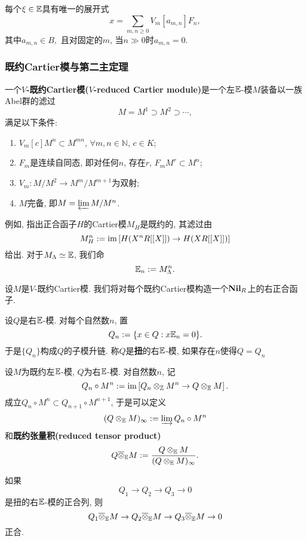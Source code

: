 \begin{theorem}
    \cite[Theorem 3.12]{Zi84}每个$\xi\in\mathbb{E}$具有唯一的展开式\[x = \sum_{m, n\ge 0} V_m [a_{m, n}] F_n,\]
    其中$a_{m, n}\in B,$ 且对固定的$m$, 当$n\gg 0$时$a_{m, n} = 0$.
\end{theorem}

\subsubsection{既约Cartier模与第二主定理}

\begin{definition}
    一个\textbf{$V$-既约Cartier模($V$-reduced Cartier module)}是一个左$\mathbb{E}$-模$M$装备以一族Abel群的滤过
    \[M = M^1\supset M^2 \supset \cdots,\]
    满足以下条件:
    \begin{enumerate}
        \item $V_m[c]M^n\subset M^{mn}$, $\forall m, n\in\mathbb{N}$, $c\in K$;
        \item $F_m$是连续自同态, 即对任何$n$, 存在$r$, $F_mM^r\subset M^n$;
        \item $V_m : M/M^2\to M^m/M^{m+1}$为双射;
        \item $M$完备, 即$M = \varprojlim M/M^n$.
    \end{enumerate}
\end{definition}

例如, \cite[Example 3.10]{Zi84}\;指出正合函子$H$的Cartier模$M_H$是既约的,
其滤过由\[M_H^n := \operatorname{im} \left[ H(X^nR[[X]])\to H(XR[[X]]) \right]\]给出.
对于$M_\Lambda \simeq\mathbb{E}$, 我们命\[\mathbb{E}_n := M_\Lambda^n.\]

设$M$是$V$-既约Cartier模.
我们将对每个既约Cartier模构造一个$\mathbf{Nil}_R$上的右正合函子.

设$Q$是右$\mathbb{E}$-模. 对每个自然数$n$, 置\[Q_n := \{x\in Q : x\mathbb{E}_n = 0\}.\]
于是$\{Q_n\}$构成$Q$的子模升链. 称$Q$是\textbf{扭}的右$\mathbb{E}$-模, 如果存在$n$使得$Q = Q_n$
\begin{defprop}
    设$M$为既约左$\mathbb{E}$-模, $Q$为右$\mathbb{E}$-模. 对自然数$n$,
    记\[Q_n\circ M^n := \operatorname{im} \left[ Q_n\otimes_{\mathbb{Z}} M^n\to Q\otimes_{\mathbb{E}} M \right].\]
    成立$Q_n\circ M^n\subset Q_{n+1}\circ M^{n+1}$,
    于是可以定义\[(Q\otimes_{\mathbb{E}} M)_\infty := \varinjlim Q_n\circ M^n\]
    和\textbf{既约张量积(reduced tensor product)}\[Q\overline{\otimes}_{\mathbb{E}} M := \frac{Q\otimes_{\mathbb{E}} M}{(Q\otimes_{\mathbb{E}} M)_\infty}.\]
\end{defprop}

\begin{lemma}\label{exact seq of torsion module is exact after tensor}
    \cite[Theorem 3.21]{Zi84}
    如果\[Q_1\to Q_2\to Q_3\to 0\]是扭的右$\mathbb{E}$-模的正合列, 则\[Q_1\overline{\otimes}_{\mathbb{E}} M\to Q_2\overline{\otimes}_{\mathbb{E}} M\to Q_3\overline{\otimes}_{\mathbb{E}} M\to 0\]正合.
\end{lemma}

